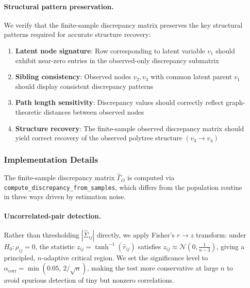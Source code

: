 \documentclass[11pt,a4paper]{article}
\numberwithin{equation}{section}
\begin{document}
\paragraph{Structural pattern preservation.} We verify that the finite-sample discrepancy matrix preserves the key structural patterns required for accurate structure recovery:
\begin{enumerate}[label=(\roman*)]
\item \textbf{Latent node signature}: Row corresponding to latent variable $v_1$ should exhibit near-zero entries in the observed-only discrepancy submatrix
\item \textbf{Sibling consistency}: Observed nodes $v_2, v_3$ with common latent parent $v_1$ should display consistent discrepancy patterns
\item \textbf{Path length sensitivity}: Discrepancy values should correctly reflect graph-theoretic distances between observed nodes
\item \textbf{Structure recovery}: The finite-sample observed discrepancy matrix should yield correct recovery of the observed polytree structure $(v_3 \to v_4)$
\end{enumerate}

\subsubsection{Implementation Details}
\label{subsubsec:fs_implementation}

\begin{sloppypar}
The finite-sample discrepancy matrix $\hat\Gamma_O$ is computed via \texttt{compute\_discrepancy\_from\_samples}, which differs from the population routine in three ways driven by estimation noise.
\end{sloppypar}

\paragraph{Uncorrelated-pair detection.}
Rather than thresholding $|\hat\Sigma_{ij}|$ directly, we apply Fisher's
$r\to z$ transform: under $H_0\colon\rho_{ij}=0$, the statistic
$z_{ij}=\tanh^{-1}(\hat r_{ij})$ satisfies $z_{ij}\approx\mathcal{N}(0,
\tfrac{1}{n-3})$, giving a principled, $n$-adaptive critical region.  We
set the significance level to $\alpha_{\text{corr}}=\min(0.05,\,2/\sqrt{n})$,
making the test more conservative at large $n$ to avoid spurious detection
of tiny but nonzero correlations.
\end{document}
